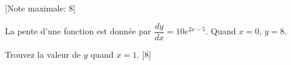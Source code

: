 \begin{question}
  \hspace*{\fill} [Note maximale: 8]\par
  \noindent La pente d’une fonction est donnée par $\dfrac{dy}{dx} = 10e^{2x - 5}$. Quand $x = 0$, $y = 8$.\par
  \medskip
  \noindent Trouvez la valeur de $y$  quand $x = 1$.\hspace*{\fill} [8]\par
\end{question}

